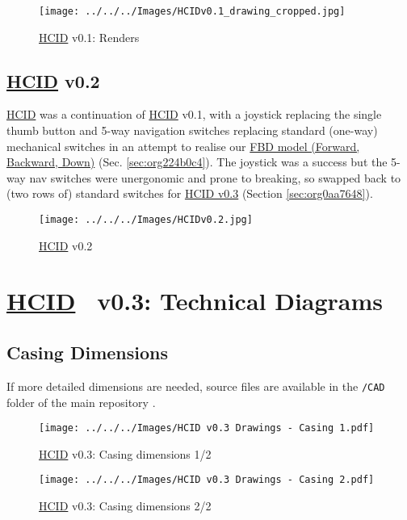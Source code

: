 \documentclass[logo,bsc,singlespacing,parskip]{infthesis}
\begin{document}
\begin{figure}[h]
\centering
\texttt{[image: ../../../Images/HCIDv0.1\_drawing\_cropped.jpg]}
\caption{\hyperref[org917851e]{HCID} v0.1: Renders}
\end{figure}

\section{\hyperref[org917851e]{HCID} v0.2}
\label{sec:org13f74b9}
\hyperref[org917851e]{HCID} was a continuation of \hyperref[org917851e]{HCID} v0.1, with a joystick replacing the single thumb button and 5-way navigation switches \autocite{5wayNavigationSwitch} replacing standard (one-way) mechanical switches in an attempt to realise our \hyperref[sec:org224b0c4]{FBD model (Forward, Backward, Down)} (Sec. \ref{sec:org224b0c4}).
The joystick was a success but the 5-way nav switches were unergonomic and prone to breaking, so swapped back to (two rows of) standard switches for \hyperref[sec:org0aa7648]{HCID v0.3} (Section \ref{sec:org0aa7648}).

\begin{figure}[h]
\centering
\texttt{[image: ../../../Images/HCIDv0.2.jpg]}
\caption{\hyperref[org917851e]{HCID} v0.2}
\end{figure}

\chapter{\hyperref[org917851e]{HCID}~ v0.3: Technical Diagrams}
\label{sec:orga0a8ff7}
\section{Casing Dimensions}
\label{sec:org81ab28d}
If more detailed dimensions are needed, source files are available in the \texttt{/CAD} folder of the main repository \autocite{sharpNazzacodeHCIDMy}.

\begin{landscape}
\begin{figure}[htbp]
\centering
\texttt{[image: ../../../Images/HCID v0.3 Drawings - Casing 1.pdf]}
\caption{\hyperref[org917851e]{HCID} v0.3: Casing dimensions 1/2}
\end{figure}
\end{landscape}

\begin{landscape}
\begin{figure}[htbp]
\centering
\texttt{[image: ../../../Images/HCID v0.3 Drawings - Casing 2.pdf]}
\caption{\hyperref[org917851e]{HCID} v0.3: Casing dimensions 2/2}
\end{figure}
\end{landscape}
\restoregeometry
\end{document}

